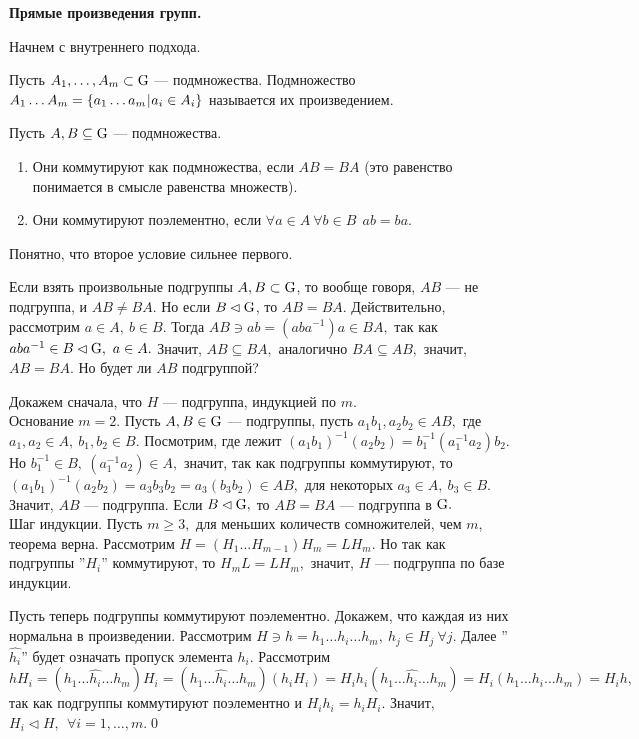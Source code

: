 \centerline{\bf Прямые произведения групп.}

Начнем с внутреннего подхода.

\de Пусть $A_1,\dots,A_m\subset{\rm G}$ --- подмножества. Подмножество $A_1\dots A_m=\{a_1\dots a_m\,\vrule\, a_i\in A_i\}$ называется их произведением.

Пусть $A,B\subseteq{\rm G}$ --- подмножества.
\begin{enumerate}
    \item Они коммутируют как подмножества, если $AB=BA$ (это равенство понимается в смысле равенства множеств).
    \item Они коммутируют поэлементно, если $\forall a\in A\ \forall b\in B\ \ ab=ba.$
\end{enumerate}
Понятно, что второе условие сильнее первого.

Если взять произвольные подгруппы $A, B\subset{\rm G}$, то вообще говоря, $AB$ --- не подгруппа, и $AB\ne BA$. Но если $B\lhd{\rm G}$, то $AB=BA$.
Действительно, рассмотрим $a\in A,\ b\in B.$ Тогда $AB\ni ab=(aba^{-1})a\in BA,$ так как $aba^{-1}\in B\lhd{\rm G},\ a\in A.$
Значит, $AB\subseteq BA,$ аналогично $BA\subseteq AB,$ значит, $AB=BA$. Но будет ли $AB$ подгруппой?


\dok Докажем сначала, что $H$ --- подгруппа, индукцией по $m$.
\\ Основание $m=2$. Пусть $A,B\in{\rm G}$ --- подгруппы, пусть $a_1b_1,a_2b_2\in AB,$ где $a_1,a_2\in A,\ b_1,b_2\in B.$
Посмотрим, где лежит $(a_1b_1)^{-1}(a_2b_2)=b_1^{-1}(a_1^{-1}a_2)b_2.$ Но $b_1^{-1}\in B,\ (a_1^{-1}a_2)\in A,$ значит, так как подгруппы коммутируют, то
$(a_1b_1)^{-1}(a_2b_2)=a_3b_3b_2=a_3(b_3b_2)\in AB,$ для некоторых $a_3\in A,\ b_3\in B.$ Значит, $AB$ --- подгруппа.
Если $B\lhd{\rm G},$ то $AB=BA$ --- подгруппа в ${\rm G}.$
\\Шаг индукции. Пусть $m\ge 3,$ для меньших количеств сомножителей, чем $m$, теорема верна.
Рассмотрим $H=(H_1\dots H_{m-1})H_m=LH_m.$ Но так как подгруппы ''$H_i$'' коммутируют, то $H_mL=LH_m,$ значит, $H$ --- подгруппа по базе индукции.

Пусть теперь подгруппы коммутируют поэлементно. Докажем, что каждая из них нормальна в произведении.
Рассмотрим $H\ni h=h_1\dots h_i\dots h_m,\ h_j\in H_j\ \forall j.$ Далее ''$\widehat{h_i}$'' будет означать пропуск элемента $h_i$. Рассмотрим
$$
hH_i=(h_1\dots \widehat{h_i}\dots h_m)H_i=(h_1\dots \widehat{h_i}\dots h_m)(h_iH_i)=H_ih_i(h_1\dots \widehat{h_i}\dots h_m)=H_i(h_1\dots h_i\dots h_m)=H_ih,
$$
так как подгруппы коммутируют поэлементно и $H_ih_i=h_iH_i$.
Значит, $H_i\lhd H,\ \ \forall i=1,\dots, m.$\quad\qed

